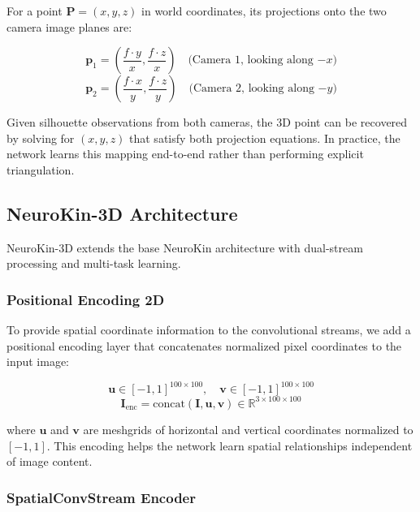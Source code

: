 \documentclass[12pt,a4paper,oneside]{report}
\begin{document}
For a point $\mathbf{P} = (x, y, z)$ in world coordinates, its projections onto the two camera image planes are:

\begin{equation}
\mathbf{p}_1 = \left( \frac{f \cdot y}{x}, \frac{f \cdot z}{x} \right) \quad \text{(Camera 1, looking along $-x$)}
\end{equation}
\begin{equation}
\mathbf{p}_2 = \left( \frac{f \cdot x}{y}, \frac{f \cdot z}{y} \right) \quad \text{(Camera 2, looking along $-y$)}
\end{equation}

Given silhouette observations from both cameras, the 3D point can be recovered by solving for $(x, y, z)$ that satisfy both projection equations. In practice, the network learns this mapping end-to-end rather than performing explicit triangulation.

\subsection{NeuroKin-3D Architecture}

NeuroKin-3D extends the base NeuroKin architecture with dual-stream processing and multi-task learning.

\subsubsection{Positional Encoding 2D}

To provide spatial coordinate information to the convolutional streams, we add a positional encoding layer that concatenates normalized pixel coordinates to the input image:

\begin{equation}
\mathbf{u} \in [-1, 1]^{100 \times 100}, \quad \mathbf{v} \in [-1, 1]^{100 \times 100}
\end{equation}
\begin{equation}
\mathbf{I}_{\text{enc}} = \text{concat}(\mathbf{I}, \mathbf{u}, \mathbf{v}) \in \mathbb{R}^{3 \times 100 \times 100}
\end{equation}

where $\mathbf{u}$ and $\mathbf{v}$ are meshgrids of horizontal and vertical coordinates normalized to $[-1, 1]$. This encoding helps the network learn spatial relationships independent of image content.

\subsubsection{SpatialConvStream Encoder}
\end{document}
